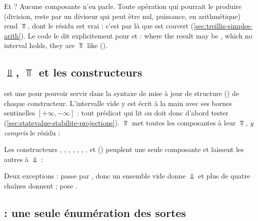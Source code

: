 Et  ? Aucune composante n'en parle. Toute opération qui pourrait le
produire (division, reste par un diviseur qui peut être nul, puissance,
 en arithmétique) rend $\Top$, dont le résidu 
est vrai : c'est par là que  est couvert
(\cref{sec:treillis-simples-arith}). Le code le dit explicitement pour
\code{\%} et \code{**} : \og where the result may be , which no
interval holds, they are $\Top$ like \code{/}\fg{}
().

\subsection{$\Bot$, $\Top$ et les constructeurs}


 est une  pour pouvoir servir dans la
syntaxe de mise à jour de structure () de
chaque constructeur. L'intervalle vide y est écrit à la main avec ses
bornes sentinelles $[+\infty, -\infty]$ : tout prédicat qui lit
 ou  doit donc d'abord tester 
(\cref{sec:statevalue-stabilite-projections}). $\Top$ met toutes les
composantes à leur $\Top$, \emph{y compris} le résidu :


Les constructeurs , , ,
, , , ,
 et 
() peuplent une seule
composante et laissent les autres à $\Bot$ :


Deux exceptions :  passe par , donc
un ensemble vide donne $\Bot$ et plus de quatre chaînes donnent
 ;  pose
.

\subsection{ : une seule énumération des sortes}

